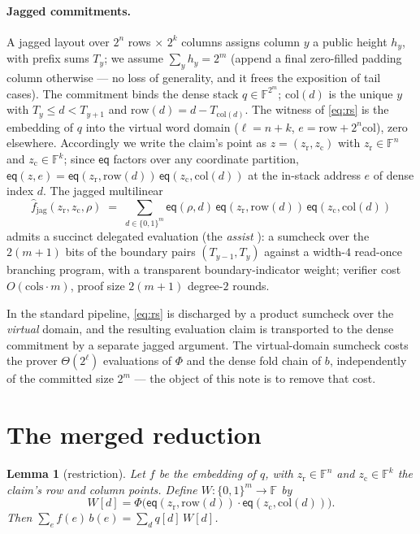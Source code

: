 \documentclass[11pt]{article}
\newcommand{\F}{\mathbb{F}}
\newcommand{\eq}{\mathsf{eq}}
\newcommand{\rowof}{\mathrm{row}}
\newcommand{\colof}{\mathrm{col}}
\newcommand{\fjag}{\hat f_{\mathrm{jag}}}
\newtheorem{lemma}[theorem]{Lemma}
\begin{document}
\paragraph{Jagged commitments.} A jagged layout over $2^{n}$ rows
$\times$ $2^{k}$ columns assigns column $y$ a public height $h_y$, with
prefix sums $T_y$; we assume $\sum_y h_y = 2^m$ (append a final
zero-filled padding column otherwise --- no loss of generality, and it
frees the exposition of tail cases). The commitment binds the dense
stack $q \in \F^{2^m}$; $\colof(d)$ is the unique $y$ with
$T_y \le d < T_{y+1}$ and $\rowof(d) = d - T_{\colof(d)}$. The witness of \eqref{eq:rs} is
the embedding of $q$ into the virtual word domain
($\ell = n + k$, $e = \rowof + 2^n\colof$), zero elsewhere.
Accordingly we write the claim's point as
$z = (z_{\mathrm r}, z_{\mathrm c})$ with $z_{\mathrm r} \in \F^{n}$
and $z_{\mathrm c} \in \F^{k}$; since $\eq$ factors over any
coordinate partition,
$\eq(z, e) = \eq(z_{\mathrm r}, \rowof(d))\,
\eq(z_{\mathrm c}, \colof(d))$ at the in-stack address $e$ of dense
index $d$. The jagged
multilinear
\[
  \fjag(z_{\mathrm r}, z_{\mathrm c}, \rho)
  \;=\;
  \sum_{d \in \{0,1\}^m}
    \eq(\rho, d)\,
    \eq(z_{\mathrm r}, \rowof(d))\,
    \eq(z_{\mathrm c}, \colof(d))
\]
admits a succinct delegated evaluation (the \emph{assist}
\cite{jagged}): a sumcheck over the $2(m{+}1)$ bits of the boundary
pairs $(T_{y-1}, T_y)$ against a width-$4$ read-once branching program,
with a transparent boundary-indicator weight; verifier cost
$O(\mathrm{cols}\cdot m)$, proof size $2(m{+}1)$ degree-$2$ rounds.

In the standard pipeline, \eqref{eq:rs} is discharged by a product
sumcheck over the \emph{virtual} domain, and the resulting evaluation
claim is transported to the dense commitment by a separate jagged
argument. The virtual-domain sumcheck costs the prover
$\Theta(2^{\ell})$ evaluations of $\Phi$ and the dense fold chain of
$b$, independently of the committed size $2^m$ --- the object of this
note is to remove
that cost.

\section{The merged reduction}\label{sec:merged}

\begin{lemma}[restriction]\label{lem:restriction}
Let $f$ be the embedding of $q$, with $z_{\mathrm r} \in \F^{n}$ and
$z_{\mathrm c} \in \F^{k}$ the claim's row and column points. Define
$W : \{0,1\}^m \to \F$ by
\[
  W[d] = \Phi\bigl(\eq(z_{\mathrm r}, \rowof(d))\cdot
                   \eq(z_{\mathrm c}, \colof(d))\bigr).
\]
Then $\sum_{e} f(e)\, b(e) = \sum_{d} q[d]\, W[d]$.
\end{lemma}
\end{document}
